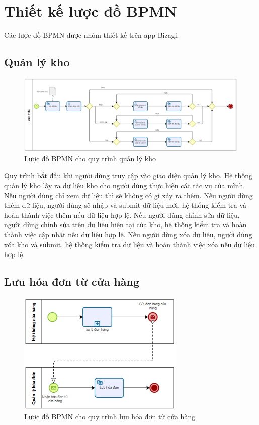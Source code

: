 \section{Thiết kế lược đồ BPMN}

Các lược đồ BPMN được nhóm thiết kế trên app Bizagi.

\subsection{Quản lý kho}
\begin{figure}[!htp]
	\centering
	\includegraphics[width=17cm]{img/BPMN/Tho/warehouse.PNG}
	\newline
	\caption{Lược đồ BPMN cho quy trình quản lý kho}
\end{figure}

Quy trình bắt đầu khi người dùng truy cập vào giao diện quản lý kho. Hệ thống quản lý kho lấy ra dữ liệu kho cho người dùng thực hiện các tác vụ của mình. Nếu người dùng chỉ xem dữ liệu thì sẽ không có gì xảy ra thêm. Nếu người dùng thêm dữ liệu, người dùng sẽ nhập và submit dữ liệu mới, hệ thống kiểm tra và hoàn thành việc thêm nếu dữ liệu hợp lệ. Nếu người dùng chỉnh sửa dữ liệu, người dùng chỉnh sửa trên dữ liệu hiện tại của kho, hệ thống kiểm tra và hoàn thành việc cập nhật nếu dữ liệu hợp lệ. Nếu người dùng xóa dữ liệu, người dùng xóa kho và submit, hệ thống kiểm tra dữ liệu và hoàn thành việc xóa nếu dữ liệu hợp lệ.

\subsection{Lưu hóa đơn từ cửa hàng}
\begin{figure}[!htp]
	\centering
	\includegraphics[width=8cm]{img/BPMN/Tho/save_invoice.PNG}
	\newline
	\caption{Lược đồ BPMN cho quy trình lưu hóa đơn từ cửa hàng}
\end{figure}

